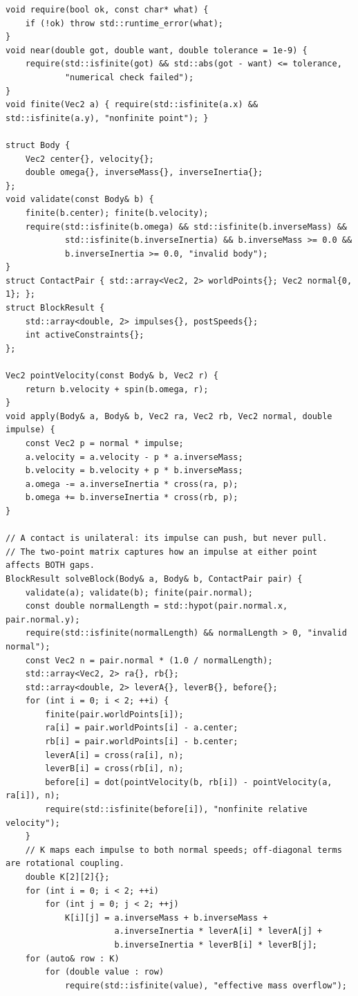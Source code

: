 \begin{verbatim}
void require(bool ok, const char* what) {
    if (!ok) throw std::runtime_error(what);
}
void near(double got, double want, double tolerance = 1e-9) {
    require(std::isfinite(got) && std::abs(got - want) <= tolerance,
            "numerical check failed");
}
void finite(Vec2 a) { require(std::isfinite(a.x) && std::isfinite(a.y), "nonfinite point"); }

struct Body {
    Vec2 center{}, velocity{};
    double omega{}, inverseMass{}, inverseInertia{};
};
void validate(const Body& b) {
    finite(b.center); finite(b.velocity);
    require(std::isfinite(b.omega) && std::isfinite(b.inverseMass) &&
            std::isfinite(b.inverseInertia) && b.inverseMass >= 0.0 &&
            b.inverseInertia >= 0.0, "invalid body");
}
struct ContactPair { std::array<Vec2, 2> worldPoints{}; Vec2 normal{0, 1}; };
struct BlockResult {
    std::array<double, 2> impulses{}, postSpeeds{};
    int activeConstraints{};
};

Vec2 pointVelocity(const Body& b, Vec2 r) {
    return b.velocity + spin(b.omega, r);
}
void apply(Body& a, Body& b, Vec2 ra, Vec2 rb, Vec2 normal, double impulse) {
    const Vec2 p = normal * impulse;
    a.velocity = a.velocity - p * a.inverseMass;
    b.velocity = b.velocity + p * b.inverseMass;
    a.omega -= a.inverseInertia * cross(ra, p);
    b.omega += b.inverseInertia * cross(rb, p);
}

// A contact is unilateral: its impulse can push, but never pull.
// The two-point matrix captures how an impulse at either point affects BOTH gaps.
BlockResult solveBlock(Body& a, Body& b, ContactPair pair) {
    validate(a); validate(b); finite(pair.normal);
    const double normalLength = std::hypot(pair.normal.x, pair.normal.y);
    require(std::isfinite(normalLength) && normalLength > 0, "invalid normal");
    const Vec2 n = pair.normal * (1.0 / normalLength);
    std::array<Vec2, 2> ra{}, rb{};
    std::array<double, 2> leverA{}, leverB{}, before{};
    for (int i = 0; i < 2; ++i) {
        finite(pair.worldPoints[i]);
        ra[i] = pair.worldPoints[i] - a.center;
        rb[i] = pair.worldPoints[i] - b.center;
        leverA[i] = cross(ra[i], n);
        leverB[i] = cross(rb[i], n);
        before[i] = dot(pointVelocity(b, rb[i]) - pointVelocity(a, ra[i]), n);
        require(std::isfinite(before[i]), "nonfinite relative velocity");
    }
    // K maps each impulse to both normal speeds; off-diagonal terms are rotational coupling.
    double K[2][2]{};
    for (int i = 0; i < 2; ++i)
        for (int j = 0; j < 2; ++j)
            K[i][j] = a.inverseMass + b.inverseMass +
                      a.inverseInertia * leverA[i] * leverA[j] +
                      b.inverseInertia * leverB[i] * leverB[j];
    for (auto& row : K)
        for (double value : row)
            require(std::isfinite(value), "effective mass overflow");


\end{verbatim}
